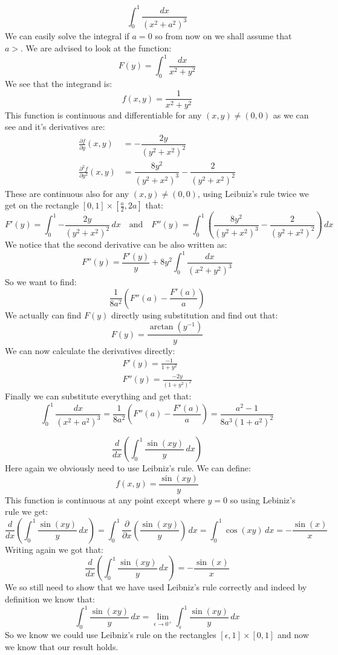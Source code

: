 \documentclass[11pt,a4paper]{article}
\begin{document}
	\[
		\int_{0}^{1}{\frac{dx}{(x^2+a^2)^3}}
	\]
	We can easily solve the integral if $a = 0$ so from now on we shall assume
	that $a > $. We are advised to look at the function:
	\[
		F(y) = \int_{0}^{1}{\frac{dx}{x^2+y^2}}
	\]
	We see that the integrand is:
	\[
		f(x,y) = \frac{1}{x^2+y^2}
	\]
	This function is continuous and differentiable for any $(x,y) \neq (0,0)$
	as we can see and it's derivatives are:
	\begin{align*}
		\frac{\partial f}{\partial y} (x,y) &= 
		-\dfrac{2y}{\left(y^2+x^2\right)^2} \\
		\frac{\partial^2 f}{\partial y^2} (x,y) &= 
		\dfrac{8y^2}{\left(y^2+x^2\right)^3}-\dfrac{2}{\left(y^2+x^2\right)^2}
	\end{align*}
	These are continuous also for any $(x,y) \neq (0,0)$, using Leibniz's
	rule twice we get on the rectangle $[0,1]\times[\frac{a}{2},2a]$ that:
	\[
		F'(y) = \int_{0}^{1}{-\dfrac{2y}{\left(y^2+x^2\right)^2}\,dx}
		\quad\text{and}\quad
		F''(y) = \int_{0}^{1}{\left(
		\dfrac{8y^2}{\left(y^2+x^2\right)^3}-\dfrac{2}
		{\left(y^2+x^2\right)^2}\right)\,dx}
	\]
	We notice that the second derivative can be also written as:
	\[
		F''(y) = \frac{F'(y)}{y} + 8y^2\int_{0}^{1}{\frac{dx}{(x^2+y^2)^3}}
	\]
	So we want to find:
	\[
		\frac{1}{8a^2}\left(F''(a) - \frac{F'(a)}{a}\right)
	\]
	We actually can find $F(y)$ directly using substitution and find
	out that:
	\[
		F(y) = \frac{\arctan(y^{-1})}{y}
	\]
	We can now calculate the derivatives directly:
	\begin{align*}
		F'(y) = \frac{-1}{1+y^2} \\
		F''(y) = \frac{-2y}{(1+y^2)^2}
	\end{align*}
	Finally we can substitute everything and get that:
	\[
		\int_{0}^{1}{\frac{dx}{(x^2+a^2)^3}} =
		\frac{1}{8a^2}\left(F''(a) - \frac{F'(a)}{a}\right) = 
		\frac{a^2-1}{8a^3(1+a^2)^2}
	\]
	
	\newpage
	
	\[
		\frac{d}{dx}\left(\int_{0}^{1}{\frac{\sin(xy)}{y}\,dx}\right)
	\]
	Here again we obviously need to use Leibniz's rule. We can define:
	\[
		f(x,y) = \frac{\sin(xy)}{y}
	\]
	This function is continuous at any point except where $y = 0$ so using
	Lebiniz's rule we get:
	\[
		\frac{d}{dx}\left(\int_{0}^{1}{\frac{\sin(xy)}{y}\,dx}\right) = 
		\int_{0}^{1}{\frac{\partial}{\partial x}
		\left(\frac{\sin(xy)}{y}\right)\,dx} = 
		\int_{0}^{1}{\cos(xy)\,dx} = -\frac{\sin(x)}{x}
	\]
	Writing again we got that:
	\[
		\frac{d}{dx}\left(\int_{0}^{1}{\frac{\sin(xy)}{y}\,dx}\right) = 
		-\frac{\sin(x)}{x}
	\]
	We so still need to show that we have used Leibniz's rule correctly and
	indeed by definition we know that:
	\[
		\int_{0}^{1}{\frac{\sin(xy)}{y}\,dx} = 
		\lim_{\epsilon\to0^+}{\int_{\epsilon}^{1}{\frac{\sin(xy)}{y}\,dx}}
	\]
	So we know we could use Leibniz's rule on the rectangles 
	$[\epsilon,1]\times[0,1]$ and now we know that our result holds.
	
\end{document}
